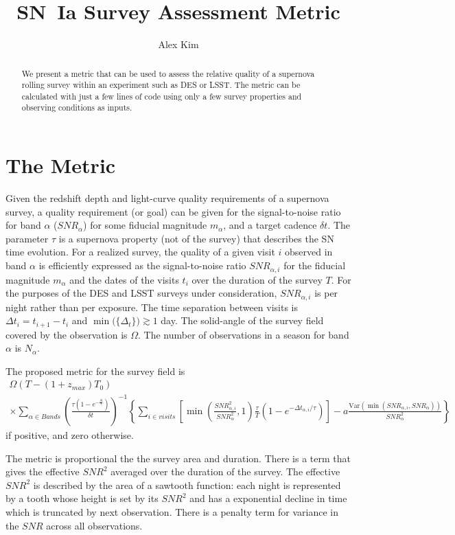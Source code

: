 \documentclass[preprint]{aastex}
\newcommand\SNR{\mathit{SNR}}
\newcommand{\Var}{\mathrm{Var}}
\begin{document}
\title{SN~Ia Survey Assessment Metric}
\author{Alex Kim}
\begin{abstract}
We present a metric that can be used to assess the relative quality of a supernova rolling survey within
an experiment such as DES or LSST.
The metric can be calculated with just a few lines of code using
only a few survey properties and observing conditions as inputs.
\end{abstract}

\section{The Metric}
Given the redshift depth and light-curve quality requirements of a supernova survey, a quality requirement (or goal) can be given
for the  signal-to-noise ratio for band $\alpha$ ($\SNR_\alpha$) for some fiducial magnitude $m_\alpha$, and a target cadence $\delta t$.
The parameter $\tau$ is a supernova property  (not of the survey) that describes the SN time evolution.
For a realized survey, the quality of a given visit $i$ observed in band $\alpha$ is efficiently expressed as the signal-to-noise ratio $\SNR_{\alpha, i}$
for the fiducial magnitude $m_\alpha$ and the dates of the visits $t_i$ over the duration of the survey $T$.  For the purposes
of the DES and LSST surveys under consideration, $\SNR_{\alpha, i}$ is per night rather than per exposure.
The time separation between visits is $\Delta t_i=t_{i+1}-t_i$ and $\min{(\{\Delta_t\}}) \gtrsim 1$ day.  The solid-angle of the survey field covered
by the observation is $\Omega$.  The number of observations in a season for band $\alpha$ is $N_\alpha$.


The proposed metric for the survey field is
\begin{multline}
	\Omega \left(T-(1+z_{max})T_0\right)   \\
	\times
	\sum_{\alpha \in Bands}	
		\left(
		\frac{\tau(1-e^{-\frac{\delta t}{\tau}})}{\delta t}\right)^{-1}		\left\{
			\sum_{i \in visits}		\left[ 		\min{\left(
				\frac{\SNR_{\alpha,i}^2}{\SNR_{\alpha}^{2} } ,1 \right)}
				\frac{\tau}{T}	\left(1-e^{-\Delta t_{\alpha,i}/\tau}\right)\right]
				-a\frac{\Var\left(\min{\left(
				\SNR_{\alpha,i},{\SNR_{\alpha} }  \right)}
				\right)}{\SNR_\alpha^2}
				\right\}
\end{multline}
if positive, and zero otherwise.

The metric is proportional the the survey area and duration.  There is a term that gives the effective $\SNR^2$ averaged
over the duration of the survey.  The effective $\SNR^2$ is described by the area of a sawtooth function: each night is represented by a tooth
whose height is set by its $\SNR^2$ and has a exponential decline in time which is truncated by  next observation.  There is a penalty term
for variance in the $\SNR$ across all observations.
\end{document}
